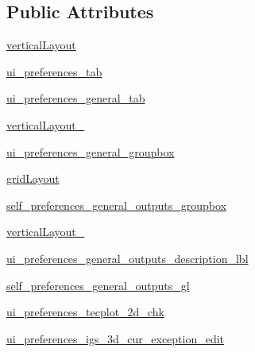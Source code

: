 \subsection*{Public Attributes}
\begin{DoxyCompactItemize}
\item 
\hyperlink{classsettings_1_1preferences_u_i_1_1_ui___preferences_dialog_ad769696a12317c7f92ed3366311bc496}{vertical\+Layout}
\item 
\hyperlink{classsettings_1_1preferences_u_i_1_1_ui___preferences_dialog_aefabfa9bb4d3ece796fee13c167d52fc}{ui\+\_\+preferences\+\_\+tab}
\item 
\hyperlink{classsettings_1_1preferences_u_i_1_1_ui___preferences_dialog_a0f603694eed0cda9d39a0d9bc19c2e10}{ui\+\_\+preferences\+\_\+general\+\_\+tab}
\item 
\hyperlink{classsettings_1_1preferences_u_i_1_1_ui___preferences_dialog_af50058d66700f51fb46a0bab1cf0aa4b}{vertical\+Layout\+\_}
\item 
\hyperlink{classsettings_1_1preferences_u_i_1_1_ui___preferences_dialog_adca7b98e8183192a5fc165c8695d44f5}{ui\+\_\+preferences\+\_\+general\+\_\+groupbox}
\item 
\hyperlink{classsettings_1_1preferences_u_i_1_1_ui___preferences_dialog_a9758be9a7207723c709109813da770fb}{grid\+Layout}
\item 
\hyperlink{classsettings_1_1preferences_u_i_1_1_ui___preferences_dialog_a2dbc9c7187826d35dfb423e2536031c1}{self\+\_\+preferences\+\_\+general\+\_\+outputs\+\_\+groupbox}
\item 
\hyperlink{classsettings_1_1preferences_u_i_1_1_ui___preferences_dialog_af17928a62255c96603422710076dbede}{vertical\+Layout\+\_}
\item 
\hyperlink{classsettings_1_1preferences_u_i_1_1_ui___preferences_dialog_a47018f6a822750d843c3ba200c5dfdd5}{ui\+\_\+preferences\+\_\+general\+\_\+outputs\+\_\+description\+\_\+lbl}
\item 
\hyperlink{classsettings_1_1preferences_u_i_1_1_ui___preferences_dialog_aec77d619b1316cf81f501262151d4388}{self\+\_\+preferences\+\_\+general\+\_\+outputs\+\_\+gl}
\item 
\hyperlink{classsettings_1_1preferences_u_i_1_1_ui___preferences_dialog_a99ea63136960e76164e086bee4b6acb5}{ui\+\_\+preferences\+\_\+tecplot\+\_\+2d\+\_\+chk}
\item 
\hyperlink{classsettings_1_1preferences_u_i_1_1_ui___preferences_dialog_ab28264229e6a9e05bf21541ed645dcb2}{ui\+\_\+preferences\+\_\+igs\+\_\+3d\+\_\+cur\+\_\+exception\+\_\+edit}

\end{DoxyCompactItemize}
